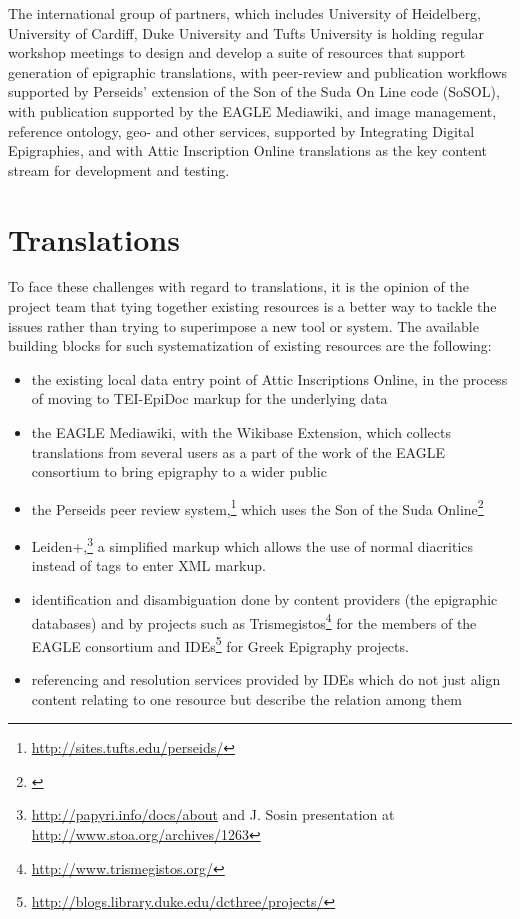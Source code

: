 \documentclass[amsthm,ebook]{saparticle}
\begin{document}
The international group of partners, which includes University of Heidelberg, University of Cardiff, Duke University and Tufts University is holding regular workshop meetings to design and  develop a suite of resources that support generation of epigraphic translations, with peer-review and publication workflows supported by Perseids’ extension of the Son of the Suda On Line code (SoSOL), with publication supported by the EAGLE Mediawiki, and image management, reference ontology, geo- and other services, supported by Integrating Digital Epigraphies, and with Attic Inscription Online translations as the key content stream for development and testing.


\section{Translations}
To face these challenges with regard to translations, it is the opinion of the project team that tying together existing resources is a better way to tackle the issues rather than trying to superimpose a new tool or system. The available building blocks for such systematization of existing resources are the following:

\begin{itemize}
\item the existing local data entry point of Attic Inscriptions Online, in the process of moving to TEI-EpiDoc markup for the underlying data
\item the EAGLE Mediawiki, with the Wikibase Extension, which collects translations from several users as a part of the work of the EAGLE consortium to bring epigraphy to a wider public 
\item the Perseids peer review system,\footnote{\url{http://sites.tufts.edu/perseids/}} which uses the Son of the Suda Online\footnote{\citet{Baumann2013}}
\item Leiden+,\footnote{\url{http://papyri.info/docs/about} and J. Sosin presentation at \url{http://www.stoa.org/archives/1263}} a simplified markup which allows the use of normal diacritics instead of tags to enter XML markup. 
\item identification and disambiguation done by content providers (the epigraphic databases) and by projects such as Trismegistos\footnote{\url{http://www.trismegistos.org/}} for the members of the EAGLE consortium and IDEs\footnote{\url{http://blogs.library.duke.edu/dcthree/projects/}} for Greek Epigraphy projects.
\item referencing and resolution services provided by IDEs which do not just align content relating to one resource but describe the relation among them
\end{itemize}
\end{document}
